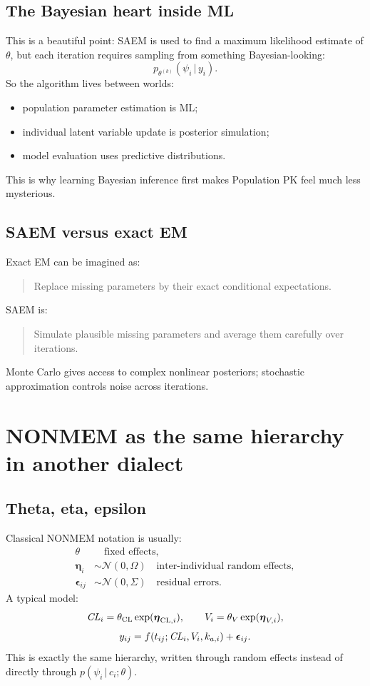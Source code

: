 \documentclass[a4paper]{article}
\newcommand{\reta}{\boldsymbol{\eta}}
\newcommand{\repsilon}{\boldsymbol{\epsilon}}
\newcommand{\given}{\,|\,}
\newcommand{\Normal}{\mathcal{N}}
\begin{document}
\subsection{The Bayesian heart inside ML}

This is a beautiful point: SAEM is used to find a maximum likelihood estimate of \(\theta\), but each iteration requires sampling from something Bayesian-looking:
\[
  p_{\theta^{(k)}}(\psi_i\given y_i).
\]
So the algorithm lives between worlds:

\begin{itemize}[leftmargin=2em]
  \item population parameter estimation is ML;
  \item individual latent variable update is posterior simulation;
  \item model evaluation uses predictive distributions.
\end{itemize}

This is why learning Bayesian inference first makes Population PK feel much less mysterious.

\subsection{SAEM versus exact EM}

Exact EM can be imagined as:
\begin{quote}
  Replace missing parameters by their exact conditional expectations.
\end{quote}
SAEM is:
\begin{quote}
  Simulate plausible missing parameters and average them carefully over iterations.
\end{quote}
Monte Carlo gives access to complex nonlinear posteriors; stochastic approximation controls noise across iterations.

\section{NONMEM as the same hierarchy in another dialect}

\subsection{Theta, eta, epsilon}

Classical NONMEM notation is usually:
\[
  \begin{aligned}
    \theta &\quad \text{fixed effects},\\
    \reta_i &\sim \Normal(0,\Omega)
      \quad \text{inter-individual random effects},\\
    \repsilon_{ij} &\sim \Normal(0,\Sigma)
      \quad \text{residual errors}.
  \end{aligned}
\]
A typical model:
\[
  \pksym{CL}_i = \theta_{\pklab{CL}}\exp(\reta_{\pklab{CL},i}),
  \qquad
  V_i = \theta_V\exp(\reta_{V,i}),
\]
\[
  y_{ij}
  =
  f(t_{ij};\pksym{CL}_i,V_i,k_{a,i})
  +
  \repsilon_{ij}.
\]
This is exactly the same hierarchy, written through random effects instead of directly through \(p(\psi_i\given c_i;\theta)\).
\end{document}
